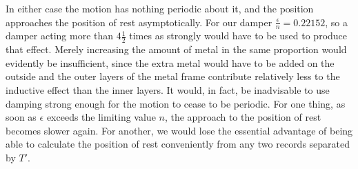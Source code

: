 In either case the motion has nothing periodic about it, and the position approaches the position of rest asymptotically. For our damper $\frac{\epsilon}{n}=0.22152$, so a damper acting more than $4\tfrac12$ times as strongly would have to be used to produce that effect. Merely increasing the amount of metal in the same proportion would evidently be insufficient, since the extra metal would have to be added on the outside and the outer layers of the metal frame contribute relatively less to the inductive effect than the inner layers. It would, in fact, be inadvisable to use damping strong enough for the motion to cease to be periodic. For one thing, as soon as $\epsilon$ exceeds the limiting value $n$, the approach to the position of rest becomes slower again. For another, we would lose the essential advantage of being able to calculate the position of rest conveniently from any two records separated by $T'$.

